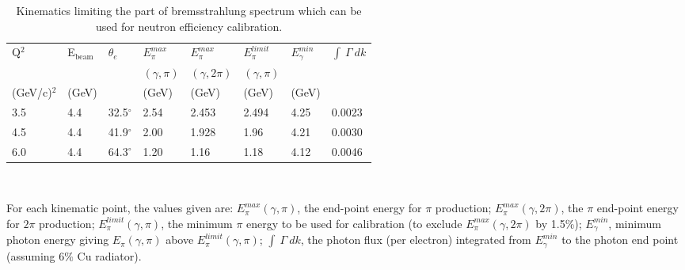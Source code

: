 \documentclass[12pt,letterpaper,oneside]{article}
\begin{document}
\begin{table}
\begin{center}
\caption{Kinematics limiting the part of bremsstrahlung spectrum which
can be used for neutron efficiency calibration. \label{brem-end-point}}
\vspace{.2in}
{\begin{tabular}{|l|l|l|l|l|l|l|l|}
\hline
Q$^2$ & E$_{\mbox{beam}}$ & 
$\theta_e $&
$E^{max}_{\pi}$&
$E^{max}_{\pi}$&
$E^{limit}_{\pi}$&
$E^{min}_\gamma$ &
$\int ~\Gamma ~dk$\\
 & & & $(\gamma,\pi)$ &$(\gamma,2\pi)$ &$(\gamma,\pi)$ & & \\
(GeV/c)$^2$ & (GeV) & &
 (GeV) &
 (GeV) &
 (GeV) &
 (GeV) &
\\
\hline
3.5 & 4.4& 32.5$^\circ$& 2.54 & 2.453 & 2.494 & 4.25 & 0.0023\\
4.5 & 4.4& 41.9$^\circ$& 2.00 & 1.928 & 1.96 & 4.21 & 0.0030\\
6.0 & 4.4& 64.3$^\circ$ &  1.20& 1.16 & 1.18 & 4.12 & 0.0046\\
\hline
\end{tabular}}\\
\end{center}
{For each kinematic point, the values given are: 
$E^{max}_{\pi}(\gamma,\pi)$, the end-point energy for $\pi$ production; 
$E^{max}_{\pi}(\gamma,2\pi)$, the $\pi$ end-point energy for $2\pi$ production; 
$E^{limit}_{\pi}(\gamma,\pi)$, the minimum $\pi$ energy to be used
for calibration (to exclude  $E^{max}_{\pi}(\gamma,2\pi)$ by 1.5\%);
$E^{min}_\gamma$, minimum photon energy giving $E_{\pi}(\gamma,\pi)$
above $E^{limit}_{\pi}(\gamma,\pi)$;
$\int ~\Gamma ~dk$, the photon flux (per electron) integrated
\cite{matthews}  from  
$E^{min}_\gamma$ to the photon end point (assuming $6\%$ Cu radiator).
}
\end{table}
\end{document}

